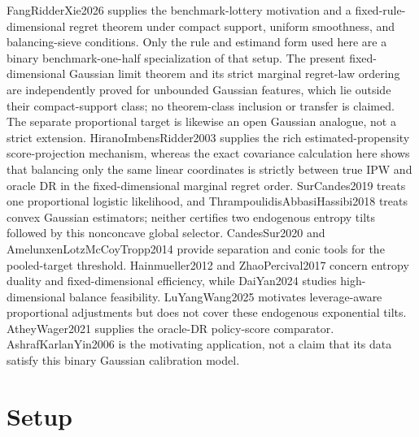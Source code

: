 \documentclass{article}
\begin{document}
FangRidderXie2026 supplies the benchmark-lottery motivation and a fixed-rule-dimensional regret theorem under compact support, uniform smoothness, and balancing-sieve conditions. Only the rule and estimand form used here are a binary benchmark-one-half specialization of that setup. The present fixed-dimensional Gaussian limit theorem and its strict marginal regret-law ordering are independently proved for unbounded Gaussian features, which lie outside their compact-support class; no theorem-class inclusion or transfer is claimed. The separate proportional target is likewise an open Gaussian analogue, not a strict extension. HiranoImbensRidder2003 supplies the rich estimated-propensity score-projection mechanism, whereas the exact covariance calculation here shows that balancing only the same linear coordinates is strictly between true IPW and oracle DR in the fixed-dimensional marginal regret order. SurCandes2019 treats one proportional logistic likelihood, and ThrampoulidisAbbasiHassibi2018 treats convex Gaussian estimators; neither certifies two endogenous entropy tilts followed by this nonconcave global selector. CandesSur2020 and AmelunxenLotzMcCoyTropp2014 provide separation and conic tools for the pooled-target threshold. Hainmueller2012 and ZhaoPercival2017 concern entropy duality and fixed-dimensional efficiency, while DaiYan2024 studies high-dimensional balance feasibility. LuYangWang2025 motivates leverage-aware proportional adjustments but does not cover these endogenous exponential tilts. AtheyWager2021 supplies the oracle-DR policy-score comparator. AshrafKarlanYin2006 is the motivating application, not a claim that its data satisfy this binary Gaussian calibration model.

\section{Setup}
\end{document}
